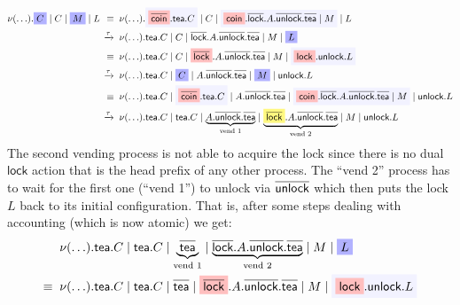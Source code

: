 \documentclass{article}
\def\mystrut{\rule{0pt}{0.68em}}
\newcommand{\act}[1]{\textsf{#1}}
\newcommand{\da}[1]{\overline{\mystrut\textsf{#1}}}
\newcommand{\highlight}[1]{%
  \colorbox{yellow!50}{$\displaystyle#1$}}
\newcommand{\highlightG}[1]{%
  \colorbox{blue!30}{$\displaystyle#1$}}
\newcommand{\highlightR}[1]{%
  \colorbox{red!25}{$\displaystyle#1$}}
\newcommand{\highlightGH}[1]{%
  \colorbox{blue!5}{$\displaystyle#1$}}
\theoremstyle{definition}
\newcommand{\src}[1]{\highlightR{#1}}
\newcommand{\srch}[1]{\highlightG{#1}}
\newcommand{\trgh}[1]{\highlightGH{#1}}
\newcommand{\subd}[1]{\highlight{#1}}
\newcommand{\restr}[2]{\nu #2 . #1}
\begin{document}
\newcommand{\actions}{(\ldots)}
%
\begin{align*}
 \restr{\srch{C} \mid C \mid \srch{M} \mid L}{\actions{}} \;\,
\equiv \;\; & \restr{\trgh{\src{\da{coin}}.\act{tea}.C} \mid C \mid \trgh{\src{\act{coin}}.\da{lock}.A.\da{unlock}.\da{tea} \mid M} \mid L}{\actions{}} \\
\xrightarrow{\tau} \;\; & \restr{{\act{tea}.C} \mid C \mid {{\da{lock}}.A.\da{unlock}.\da{tea} \mid M} \mid \srch{L}}{\actions{}} \\
\equiv \;\; & \restr{{\act{tea}.C} \mid C \mid {{\src{\da{lock}}}.A.\da{unlock}.\da{tea} \mid M} \mid \trgh{\src{\act{lock}}.\act{unlock}.L}}{\actions{}} \\
\xrightarrow{\tau} \;\; & \restr{\act{tea}.C \mid \srch{C} \mid A.\da{unlock}.\da{tea} \mid \srch{M} \mid \act{unlock}.L}{\actions{}}  \\
\equiv \;\; & \restr{\act{tea}.C \mid \trgh{\src{\da{coin}}.\act{tea}.C} \mid A.\da{unlock}.\da{tea} \mid \trgh{\src{\act{coin}}.\da{lock}.A.\da{unlock}.\da{tea} \mid M} \mid \act{unlock}.L}{\actions{}} \\
\xrightarrow{\tau} \;\; & \restr{\act{tea}.C \mid {\act{tea}.C} \mid
                          \underbrace{A.\da{unlock}.\da{tea}}_{\text{vend
                          1}} \mid
                          \underbrace{\subd{\da{lock}}.A.\da{unlock}.\da{tea}}_{\text{vend 2}}\mid M \mid \act{unlock}.L}{\actions{}}
\end{align*}
%
The second vending process is not
able to acquire the lock since there is no dual $\act{lock}$ action
that is the head prefix of any other process. The ``vend 2'' process has to wait for
the first one (``vend 1'') to unlock via $\da{unlock}$ which then puts the lock $L$
back to its initial configuration. That is, after some steps dealing
with accounting (which is now atomic) we get:
%
\begin{align*}
   & \restr{\act{tea}.C \mid {\act{tea}.C} \mid
                          \underbrace{\da{tea}}_{\text{vend
                          1}} \mid
                          \underbrace{{\da{lock}}.A.\da{unlock}.\da{tea}}_{\text{vend
                          2}}\mid M \mid
  \srch{L}}{\actions{}} \\
 \equiv \;\; & \restr{\act{tea}.C \mid {\act{tea}.C} \mid
                          {\da{tea}} \mid
                          {\src{\da{lock}}.A.\da{unlock}.\da{tea}} \mid M \mid
                \trgh{\src{\act{lock}}.\act{unlock}.L}}{\actions{}}
\end{align*}
\end{document}
